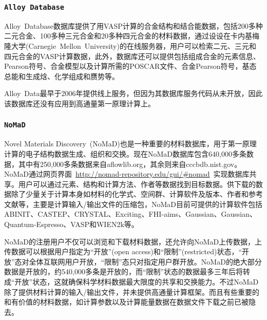 \frame
{
\frametitle{\tt{Alloy Database}}
\textrm{Alloy~Database}数据库提供了用\textrm{VASP}计算的合金结构和结合能数据\cite{AlloyD_URL}，包括200多种二元合金、100多种三元合金和20多种四元合金的材料数据，通过设设在卡内基梅隆大学\textrm{(Carnegie~Mellon~University)}的在线服务器，用户可以检索二元、三元和四元合金的\textrm{VASP}计算数据，此外，数据库还可以提供包括组成合金的元素信息、\textrm{Pearson}符号、合金模型以及计算所需的\textrm{POSCAR}文件、合金\textrm{Pearson}符号，基态总能和生成焓、化学组成和赝势等。

\textrm{Alloy~Data}最早于2006年提供线上服务，但因为其数据库服务代码从未开放，因此该数据库还没有应用到高通量第一原理计算上。
}

\frame
{
\frametitle{\tt{NoMaD}}
\textrm{Novel Materials Discovery~(NoMaD)}也是一种重要的材料数据库，用于第一原理计算的电子结构数据生成、组织和交换\cite{NoMaD_URL}。现在\textrm{NoMaD}数据库包含640,000多条数据，其中有250,000多条数据来自\textrm{aflowlib.org}，其余则来自\textrm{cccbdb.nist.gov}。\textrm{NoMaD}通过网页界面~\textrm{\url{http://nomad-repository.edu/gui/\#nomad}}~实现数据库共享。用户可以通过元素、结构和计算方法、作者等数据找到目标数据。供下载的数据除了少量关于计算本身如材料的化学式、空间群、计算软件及版本、作者和参考文献等，主要是计算输入/输出文件的压缩包，\textrm{NoMaD}目前可提供的计算软件包括\textrm{ABINIT}、\textrm{CASTEP}、\textrm{CRYSTAL}、\textrm{Exciting}、\textrm{FHI-aims}、\textrm{Gaussian}、\textrm{Gaussian}、\textrm{Quantum-Espresso}、\textrm{VASP}和\textrm{WIEN2k}等。

\textrm{NoMaD}的注册用户不仅可以浏览和下载材料数据，还允许向\textrm{NoMaD}上传数据，上传数据可以根据用户指定为“开放”\textrm{(open access)}和“限制”\textrm{(restricted)}状态，“开放”态对全体互联网用户开放，“限制”态只对指定用户群开放。\textrm{NoMaD}的绝大部分数据是开放的，约540,000多条是开放的，而“限制”状态的数据最多三年后将转成“开放”状态，这就确保科学材料数据最大限度的共享和交换能力。不过\textrm{NoMaD}除了提供材料计算的输入/输出文件，并未提供高通量计算框架。而且有些重要的和有价值的材料数据，如计算参数以及计算能量数据在数据文件下载之前已被隐去。
}

